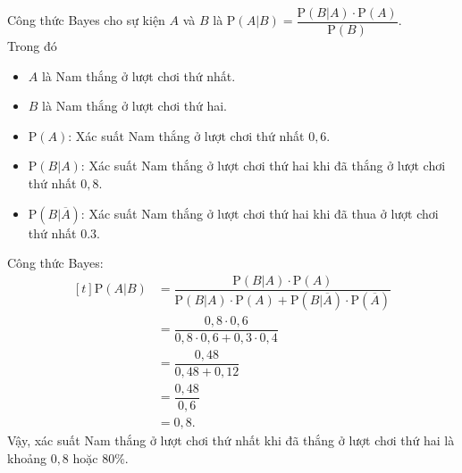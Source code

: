 \begin{bt}[CKP]
{\begin{listEX}
\begin{center}
			\end{center}
			\item 
			Công thức Bayes cho sự kiện $A$ và $B$ là $\mathrm{P}(A | B)=\dfrac{\mathrm{P}(B | A) \cdot \mathrm{P}(A)}{\mathrm{P}(B)}	$.\\
			Trong đó
			\begin{itemize}
				\item $A$ là Nam thắng ở lượt chơi thứ nhất.
				\item $B$ là Nam thắng ở lượt chơi thứ hai.
				\item $\mathrm{P}(A)$: Xác suất Nam thắng ở lượt chơi thứ nhất $0{,}6$.
				\item $\mathrm{P}(B | A)$: Xác suất Nam thắng ở lượt chơi thứ hai khi đã thắng ở lượt chơi thứ nhất $0{,}8$.
				\item $\mathrm{P}(B | \overline{A})$: Xác suất Nam thắng ở lượt chơi thứ hai khi đã thua ở lượt chơi thứ nhất $0.3$.
			\end{itemize}
			Công thức Bayes:
			$$
			\begin{aligned}[t]
				\mathrm{P}(A | B)&=\dfrac{\mathrm{P}(B | A) \cdot \mathrm{P}(A)}{\mathrm{P}(B | A) \cdot \mathrm{P}(A)+\mathrm{P}(B | \overline{A}) \cdot \mathrm{P}(\overline{A})} \\
				& =\dfrac{0{,}8 \cdot 0{,}6}{0{,}8 \cdot 0{,}6+0{,}3 \cdot 0{,}4} \\
				& = \dfrac{0{,}48}{0{,}48+0{,}12} \\
				& = \dfrac{0{,}48}{0{,}6} \\
				& = 0{,}8.
			\end{aligned}
			$$
			Vậy, xác suất Nam thắng ở lượt chơi thứ nhất khi đã thắng ở lượt chơi thứ hai là khoảng $0{,}8$ hoặc $80 \%$.
		\end{listEX}
	}
\end{bt}


